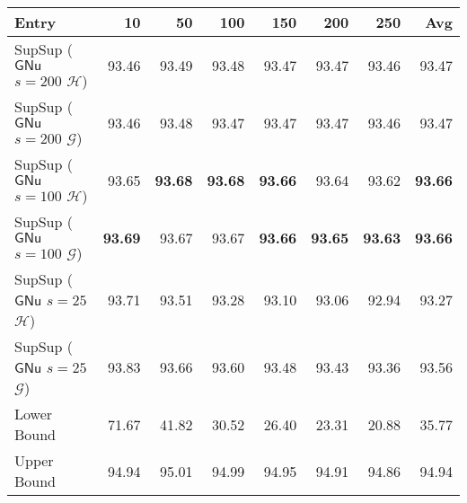\begin{tabular}{lrrrrrrr}
\toprule
                                                      Entry &    10 &    50 &   100 &   150 &   200 &   250 &   Avg \\
\midrule
 SupSup ($\ensuremath{\mathsf{GNu}}$ $s=200$ $\mathcal{H}$) & 93.46 & 93.49 & 93.48 & 93.47 & 93.47 & 93.46 & 93.47 \\
 SupSup ($\ensuremath{\mathsf{GNu}}$ $s=200$ $\mathcal{G}$) & 93.46 & 93.48 & 93.47 & 93.47 & 93.47 & 93.46 & 93.47 \\
 SupSup ($\ensuremath{\mathsf{GNu}}$ $s=100$ $\mathcal{H}$) & 93.65 & \textbf{93.68} & \textbf{93.68} & \textbf{93.66} & 93.64 & 93.62 & \textbf{93.66} \\
 SupSup ($\ensuremath{\mathsf{GNu}}$ $s=100$ $\mathcal{G}$) & \textbf{93.69} & 93.67 & 93.67 & \textbf{93.66} & \textbf{93.65} & \textbf{93.63} & \textbf{93.66} \\
  SupSup ($\ensuremath{\mathsf{GNu}}$ $s=25$ $\mathcal{H}$) & 93.71 & 93.51 & 93.28 & 93.10 & 93.06 & 92.94 & 93.27 \\
  SupSup ($\ensuremath{\mathsf{GNu}}$ $s=25$ $\mathcal{G}$) & 93.83 & 93.66 & 93.60 & 93.48 & 93.43 & 93.36 & 93.56 \\
                                                Lower Bound & 71.67 & 41.82 & 30.52 & 26.40 & 23.31 & 20.88 & 35.77 \\\midrule
                                                Upper Bound & 94.94 & 95.01 & 94.99 & 94.95 & 94.91 & 94.86 & 94.94 \\
\bottomrule
\end{tabular}
